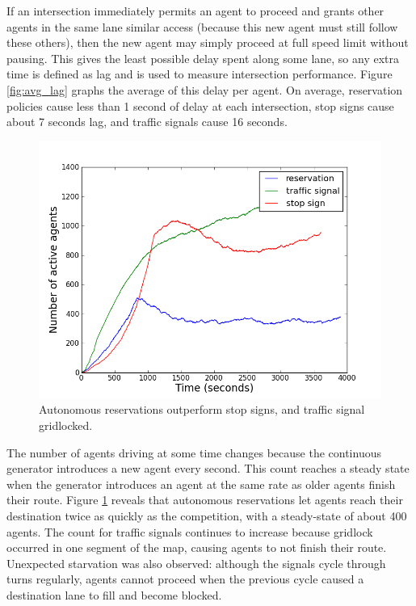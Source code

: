 \documentclass[letterpaper, 10 pt, conference]{ieeeconf}  %
\begin{document}
If an intersection immediately permits an agent to proceed and grants other
agents in the same lane similar access (because this new agent must still follow
these others), then the new agent may simply proceed at full speed limit without
pausing. This gives the least possible delay spent along some lane, so any extra
time is defined as lag and is used to measure intersection performance. Figure
\ref{fig:avg_lag} graphs the average of this delay per agent. On average,
reservation policies cause less than 1 second of delay at each intersection,
stop signs cause about 7 seconds lag, and traffic signals cause 16 seconds.


\begin{figure}[h]
  \centering \includegraphics[width=\linewidth]{agent_cnt_atx.png}
  \caption{Autonomous reservations outperform stop signs, and traffic signal
           gridlocked. }
  \label{fig:agent_cnt}
  \vspace{-10pt}
\end{figure}

The number of agents driving at some time changes because the continuous
generator introduces a new agent every second. This count reaches a steady
state when the generator introduces an agent at the same rate as older agents
finish their route. Figure \ref{fig:agent_cnt} reveals that autonomous
reservations let agents reach their destination twice as quickly as the
competition, with a steady-state of about 400 agents. The count for traffic
signals continues to increase because gridlock occurred in one segment of the
map, causing agents to not finish their route.  Unexpected starvation was also
observed: although the signals cycle through turns regularly, agents cannot
proceed when the previous cycle caused a destination lane to fill and become
blocked.
\end{document}
